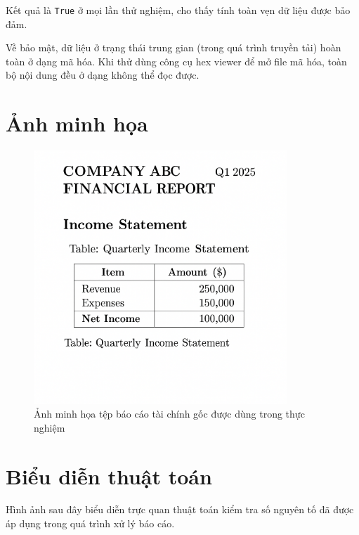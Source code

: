 Kết quả là \texttt{True} ở mọi lần thử nghiệm, cho thấy tính toàn vẹn dữ liệu được bảo đảm.

Về bảo mật, dữ liệu ở trạng thái trung gian (trong quá trình truyền tải) hoàn toàn ở dạng mã hóa. Khi thử dùng công cụ hex viewer để mở file mã hóa, toàn bộ nội dung đều ở dạng không thể đọc được.

\section{Ảnh minh họa}

\begin{figure}[H]
  \centering
  \includegraphics[width=0.85\textwidth]{figs/financial_report.png}
  \caption{Ảnh minh họa tệp báo cáo tài chính gốc được dùng trong thực nghiệm}
\end{figure}
\section{Biểu diễn thuật toán}

Hình ảnh sau đây biểu diễn trực quan thuật toán kiểm tra số nguyên tố đã được áp dụng trong quá trình xử lý báo cáo.

